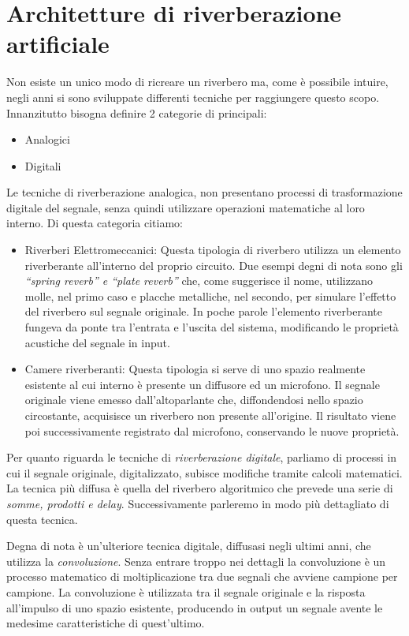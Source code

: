\section{Architetture di riverberazione artificiale}

Non esiste un unico modo di ricreare un riverbero ma, come è possibile intuire, negli anni si sono sviluppate differenti tecniche per raggiungere questo scopo.
Innanzitutto bisogna definire 2 categorie di principali:

\begin{itemize}
\item Analogici
\item Digitali
\end{itemize}

Le tecniche di riverberazione analogica, non presentano processi di trasformazione digitale del segnale, senza quindi utilizzare operazioni matematiche al loro interno.
Di questa categoria citiamo:

\begin{itemize}
\item Riverberi Elettromeccanici: Questa tipologia di riverbero utilizza un elemento riverberante all’interno del proprio circuito. Due esempi degni di nota sono gli \emph{“spring reverb” e “plate reverb”} che, come suggerisce il nome, utilizzano molle, nel primo caso e placche metalliche, nel secondo, per simulare l’effetto del riverbero sul segnale originale. In poche parole l’elemento riverberante fungeva da ponte tra l’entrata e l’uscita del sistema, modificando le proprietà acustiche del segnale in input.
\item Camere riverberanti: Questa tipologia si serve di uno spazio realmente esistente al cui interno è presente un diffusore ed un microfono. Il segnale originale viene emesso dall’altoparlante che, diffondendosi nello spazio circostante, acquisisce un riverbero non presente all’origine. Il risultato viene poi successivamente registrato dal microfono, conservando le nuove proprietà.
\end{itemize}

Per quanto riguarda le tecniche di \emph{riverberazione digitale}, parliamo di processi in cui il segnale originale, digitalizzato, subisce modifiche tramite calcoli matematici. La tecnica più diffusa è quella del riverbero algoritmico che prevede una serie di \textit{somme, prodotti e delay}. Successivamente parleremo in modo più dettagliato di questa tecnica.

Degna di nota è un’ulteriore tecnica digitale, diffusasi negli ultimi anni, che utilizza la \emph{convoluzione}. Senza entrare troppo nei dettagli la convoluzione è un processo matematico di moltiplicazione tra due segnali che avviene campione per campione. La convoluzione è utilizzata tra il segnale originale e la risposta all’impulso di uno spazio esistente, producendo in output un segnale avente le medesime caratteristiche di quest’ultimo.
